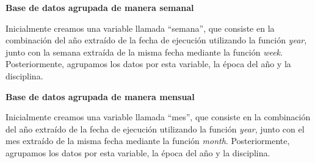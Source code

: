 \documentclass[
  11pt,
  bookmarksnumbered]{article}
\begin{document}
\textbf{Base de datos agrupada de manera semanal}

Inicialmente creamos una variable llamada ``semana'', que consiste en la combinación del año extraído de la fecha de ejecución utilizando la función \emph{year}, junto con la semana extraída de la misma fecha mediante la función \emph{week}.
Posteriormente, agrupamos los datos por esta variable, la época del año y la disciplina.

\textbf{Base de datos agrupada de manera mensual}

Inicialmente creamos una variable llamada ``mes'', que consiste en la combinación del año extraído de la fecha de ejecución utilizando la función \emph{year}, junto con el mes extraído de la misma fecha mediante la función \emph{month}.
Posteriormente, agrupamos los datos por esta variable, la época del año y la disciplina.

\newpage
\end{document}
